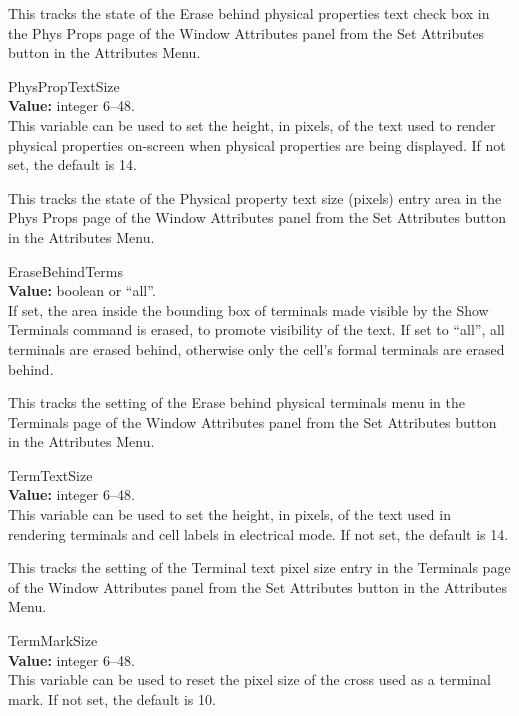 \begin{description}
This tracks the state of the {\cb Erase behind physical properties
text} check box in the {\cb Phys Props} page of the {\cb Window
Attributes} panel from the {\cb Set Attributes} button in the {\cb
Attributes Menu}.

\item{\et PhysPropTextSize}\\
{\bf Value:} integer 6--48.\\
This variable can be used to set the height, in pixels, of the text
used to render physical properties on-screen when physical properties
are being displayed.  If not set, the default is 14.

This tracks the state of the {\cb Physical property text size
(pixels)} entry area in the {\cb Phys Props} page of the {\cb Window
Attributes} panel from the {\cb Set Attributes} button in the {\cb
Attributes Menu}.

\item{\et EraseBehindTerms}\\
{\bf Value:} boolean or ``{\vt all}''.\\
If set, the area inside the bounding box of terminals made visible
by the {\cb Show Terminals} command is erased, to promote visibility
of the text.  If set to ``{\vt all}'', all terminals are erased
behind, otherwise only the cell's formal terminals are erased behind.

This tracks the setting of the {\cb Erase behind physical terminals}
menu in the {\cb Terminals} page of the {\cb Window Attributes} panel
from the {\cb Set Attributes} button in the {\cb Attributes Menu}.

\item{\et TermTextSize}\\
{\bf Value:} integer 6--48.\\
This variable can be used to set the height, in pixels, of the text
used in rendering terminals and cell labels in electrical mode.  If
not set, the default is 14.

This tracks the setting of the {\cb Terminal text pixel size} entry in
the {\cb Terminals} page of the {\cb Window Attributes} panel from the
{\cb Set Attributes} button in the {\cb Attributes Menu}.

\item{\et TermMarkSize}\\
{\bf Value:} integer 6--48.\\
This variable can be used to reset the pixel size of the cross used as
a terminal mark.  If not set, the default is 10.


\end{description}
